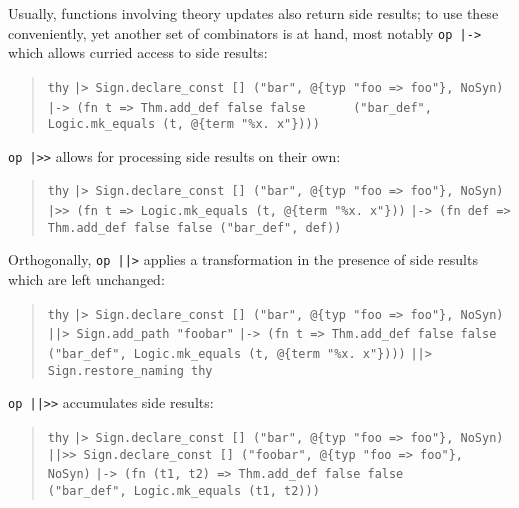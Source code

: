 \begin{isabellebody}
%
\begin{isamarkuptext}%
\noindent Usually, functions involving theory updates also return
  side results; to use these conveniently, yet another
  set of combinators is at hand, most notably \verb|op |\verb,|,\verb|->|
  which allows curried access to side results:
  \begin{quotation}
\verb|thy|\isasep\isanewline%
\verb||\verb,|,\verb|> Sign.declare_const [] ("bar", @{typ "foo => foo"}, NoSyn)|\isasep\isanewline%
\verb||\verb,|,\verb|-> (fn t => Thm.add_def false false|\isasep\isanewline%
\verb|      ("bar_def", Logic.mk_equals (t, @{term "%x. x"})))|\isasep\isanewline%

  \end{quotation}

  \noindent \verb|op |\verb,|,\verb|>>| allows for processing side results on their own:
  \begin{quotation}
\verb|thy|\isasep\isanewline%
\verb||\verb,|,\verb|> Sign.declare_const [] ("bar", @{typ "foo => foo"}, NoSyn)|\isasep\isanewline%
\verb||\verb,|,\verb|>> (fn t => Logic.mk_equals (t, @{term "%x. x"}))|\isasep\isanewline%
\verb||\verb,|,\verb|-> (fn def => Thm.add_def false false ("bar_def", def))|\isasep\isanewline%

  \end{quotation}

  \noindent Orthogonally, \verb|op |\verb,|,\verb||\verb,|,\verb|>| applies a transformation
  in the presence of side results which are left unchanged:
  \begin{quotation}
\verb|thy|\isasep\isanewline%
\verb||\verb,|,\verb|> Sign.declare_const [] ("bar", @{typ "foo => foo"}, NoSyn)|\isasep\isanewline%
\verb||\verb,|,\verb||\verb,|,\verb|> Sign.add_path "foobar"|\isasep\isanewline%
\verb||\verb,|,\verb|-> (fn t => Thm.add_def false false|\isasep\isanewline%
\verb|      ("bar_def", Logic.mk_equals (t, @{term "%x. x"})))|\isasep\isanewline%
\verb||\verb,|,\verb||\verb,|,\verb|> Sign.restore_naming thy|\isasep\isanewline%

  \end{quotation}

  \noindent {}\verb|op |\verb,|,\verb||\verb,|,\verb|>>| accumulates side results:
  \begin{quotation}
\verb|thy|\isasep\isanewline%
\verb||\verb,|,\verb|> Sign.declare_const [] ("bar", @{typ "foo => foo"}, NoSyn)|\isasep\isanewline%
\verb||\verb,|,\verb||\verb,|,\verb|>> Sign.declare_const [] ("foobar", @{typ "foo => foo"}, NoSyn)|\isasep\isanewline%
\verb||\verb,|,\verb|-> (fn (t1, t2) => Thm.add_def false false|\isasep\isanewline%
\verb|      ("bar_def", Logic.mk_equals (t1, t2)))|\isasep\isanewline%


\end{quotation}
\end{isamarkuptext}
\end{isabellebody}

